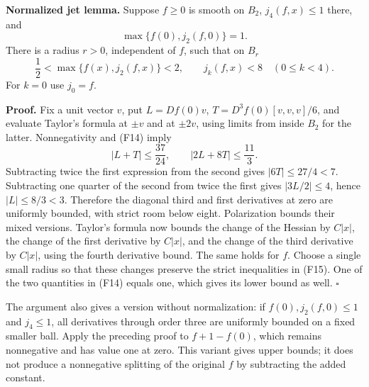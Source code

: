 \documentclass[
  11pt,
]{article}
\makeatletter
\let\ReaderOriginalAnchorStart\hyper@anchorstart
\let\ReaderOriginalAnchorEnd\hyper@anchorend
\let\ReaderPendingAliases\@empty
\def\ReaderArmAliases#1{\gdef\ReaderPendingAliases{#1}}
\def\hyper@anchorstart#1{\ReaderIfNativeAnchorTF{#1}{\ReaderPendingAliases\global\let\ReaderPendingAliases\@empty}{}\ReaderOriginalAnchorStart{#1}}
\makeatother
\begin{document}
\textbf{Normalized jet lemma.} Suppose \(f\geq0\) is smooth on \(B_2\),
\(j_4(f,x)\leq1\) there, and \[
\max\{f(0),j_2(f,0)\}=1.
\tag{F14}
\] There is a radius \(r>0\), independent of \(f\), such that on \(B_r\)
\[
\frac12<\max\{f(x),j_2(f,x)\}<2,
\qquad j_k(f,x)<8\quad(0\leq k<4).
\tag{F15}
\] For \(k=0\) use \(j_0=f\).

\textbf{Proof.} Fix a unit vector \(v\), put \(L=Df(0)v\),
\(T=D^3f(0)[v,v,v]/6\), and evaluate Taylor's formula at \(\pm v\) and
at \(\pm2v\), using limits from inside \(B_2\) for the latter.
Nonnegativity and (F14) imply \[
|L+T|\leq\frac{37}{24},\qquad
|2L+8T|\leq\frac{11}{3}.
\tag{F16}
\] Subtracting twice the first expression from the second gives
\(|6T|\leq27/4<7\). Subtracting one quarter of the second from twice the
first gives \(|3L/2|\leq4\), hence \(|L|\leq8/3<3\). Therefore the
diagonal third and first derivatives at zero are uniformly bounded, with
strict room below eight. Polarization bounds their mixed versions.
Taylor's formula now bounds the change of the Hessian by \(C|x|\), the
change of the first derivative by \(C|x|\), and the change of the third
derivative by \(C|x|\), using the fourth derivative bound. The same
holds for \(f\). Choose a single small radius so that these changes
preserve the strict inequalities in (F15). One of the two quantities in
(F14) equals one, which gives its lower bound as well. \(\square\)

The argument also gives a version without normalization: if
\(f(0),j_2(f,0)\leq1\) and \(j_4\leq1\), all derivatives through order
three are uniformly bounded on a fixed smaller ball. Apply the preceding
proof to \(f+1-f(0)\), which remains nonnegative and has value one at
zero. This variant gives upper bounds; it does not produce a nonnegative
splitting of the original \(f\) by subtracting the added constant.

\ReaderArmAliases{\ReaderOriginalAnchorStart{AN03-SFP-004}\ReaderOriginalAnchorEnd\begingroup\expandafter\def\csname @currentHref\endcsname{AN03-SFP-004}\label{AN03-SFP-004}\endgroup\ReaderOriginalAnchorStart{an03-sfp-004-removing-one-phase-direction-by-a-scalar-splitting}\ReaderOriginalAnchorEnd\begingroup\expandafter\def\csname @currentHref\endcsname{an03-sfp-004-removing-one-phase-direction-by-a-scalar-splitting}\label{an03-sfp-004-removing-one-phase-direction-by-a-scalar-splitting}\endgroup\ReaderOriginalAnchorStart{4-removing-one-phase-direction-by-a-scalar-splitting}\ReaderOriginalAnchorEnd\begingroup\expandafter\def\csname @currentHref\endcsname{4-removing-one-phase-direction-by-a-scalar-splitting}\label{4-removing-one-phase-direction-by-a-scalar-splitting}\endgroup\ReaderOriginalAnchorStart{removing-one-phase-direction-by-a-scalar-splitting}\ReaderOriginalAnchorEnd}
\end{document}

